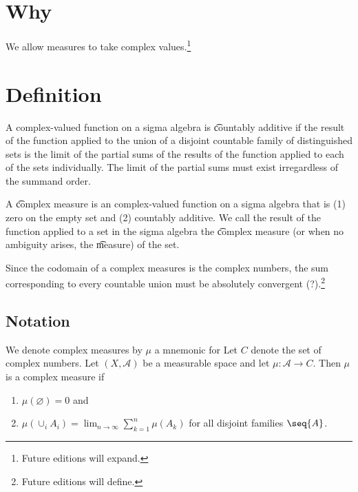 

\section*{Why}

We allow measures to take complex values.\footnote{Future editions will expand.}

\section*{Definition}

A complex-valued
function on a
sigma algebra is
\t{countably additive}
if the result of the function applied to
the union of a disjoint countable family of
distinguished sets is the limit of the partial
sums of the results of the function applied
to each of the sets individually.
The limit of the partial sums must
exist irregardless of the summand order.

A \t{complex measure} is an complex-valued function on a sigma algebra that is
(1) zero on the empty set and
(2) countably additive.
We call the result of the function applied to a set in the sigma algebra the \t{complex measure} (or when no ambiguity arises, the \t{measure}) of the set.

Since the codomain of
a complex measures is
the complex numbers,
the sum corresponding
to every countable union
must be absolutely convergent (?).\footnote{Future editions will define.}

\subsection*{Notation}

We denote complex measures by $\mu $ a mnemonic for 
Let $C$ denote the set of complex numbers.
Let $(X, \mathcal{A} )$ be a measurable space and let $\mu : \mathcal{A}  \to C$.
Then $\mu $ is a complex measure if
    \begin{enumerate}
      \item $\mu (\varnothing) = 0$ and
      \item $\mu (\cup_{i} A_i) = \lim_{n \to \infty} \sum_{k = 1}^{n} \mu (A_k)$
for all disjoint families $\seq{A}$.
    \end{enumerate}
